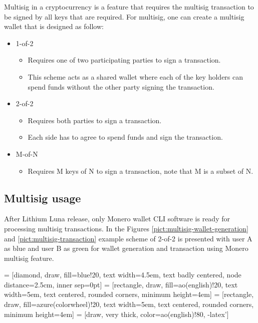 \documentclass[
  printed, %
  table,   %
  lof,     %
  lot,     %
           oneside, color
]{fithesis3}
\begin{document}
Multisig in a cryptocurrency is a feature that requires the multisig transaction to be signed by all keys that are required. For multisig, one can create a multisig wallet that is designed as follow:
\begin{itemize}\itemsep0em
\item 1-of-2 
\begin{itemize}\itemsep0em \item Requires one of two participating parties to sign a transaction. \item This scheme acts as a shared wallet where each of the key holders can spend funds without the other party signing the transaction. \end{itemize}
\item 2-of-2 \begin{itemize}\itemsep0em \item  Requires both parties to sign a transaction. \item Each side has to agree to spend funds and sign the transaction.\end{itemize}
\item M-of-N \begin{itemize}\itemsep0em \item  Requires M keys of N to sign a transaction, note that M is a subset of N. \end{itemize}
\end{itemize}

\subsection{Multisig usage}
After Lithium Luna release, only Monero wallet CLI software is ready for processing multisig transactions. In the Figures \ref{pict:multisig-wallet-generation} and \ref{pict:multisig-transaction} example scheme of 2-of-2 is presented with user A as blue and user B as green for wallet generation and transaction using Monero multisig feature. 


\newpage
{}
 = [diamond, draw, fill=blue!20,
    text width=4.5em, text badly centered, node distance=2.5cm, inner sep=0pt]
 = [rectangle, draw, fill=ao(english)!20,
    text width=5em, text centered, rounded corners, minimum height=4em]
 = [rectangle, draw, fill=azure(colorwheel)!20,
    text width=5em, text centered, rounded corners, minimum height=4em]
 = [draw, very thick, color=ao(english)!80, -latex']
\end{document}
